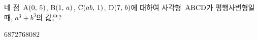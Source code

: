 네 점~$\mathrm{A}(0,\,5)$, $\mathrm{B}(1,\,a)$, $\mathrm{C}(ab,\,1)$, $\mathrm{D}(7,\,b)$에 대하여 사각형~$\mathrm{ABCD}$가 평행사변형일 때, $a^3+b^3$의 값은?
\begin{choices32}{$68$}{$72$}{$76$}{$80$}{$82$}\end{choices32}
